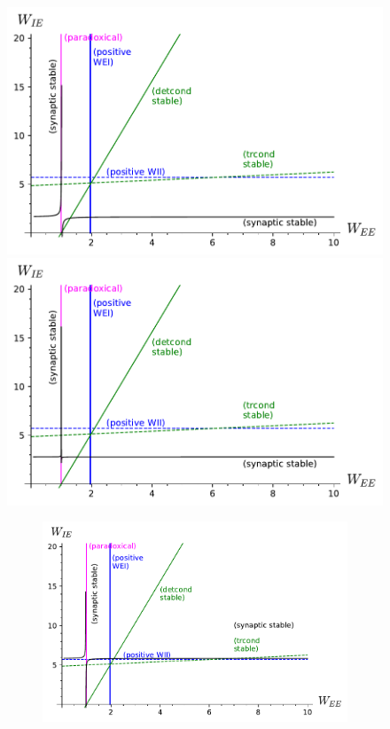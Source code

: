 \documentclass[
twocolumn,
]{article}
\begin{document}
\begin{figure}[!ht]
\centering
\parbox[c]{\columnwidth}{
\includegraphics[width=\columnwidth]{SS_stability.pdf}
\includegraphics[width=\columnwidth]{SS_stability_slowExc.pdf}}
\parbox[c]{\columnwidth}{
\begin{figure}[H]
\includegraphics[width=\columnwidth]{SS_stability_slowInh.pdf}

\end{figure}}
\end{figure}
\end{document}

